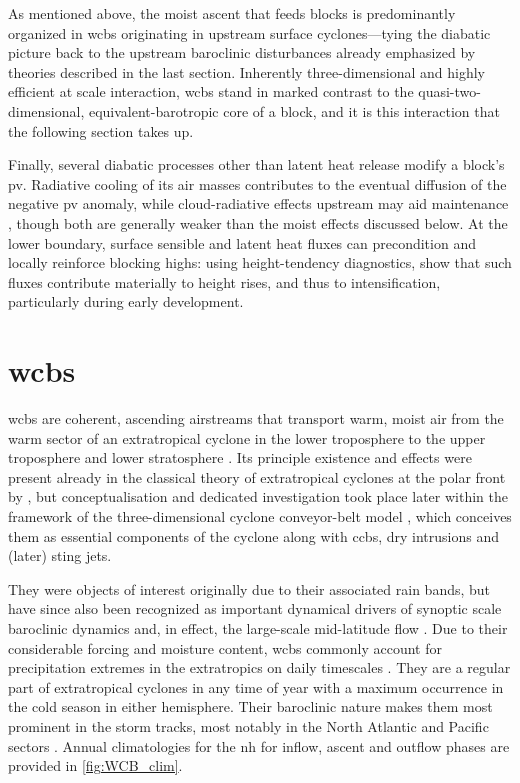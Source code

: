 As mentioned above, the moist ascent that feeds blocks is predominantly
organized in \glspl{wcb} originating in upstream surface
cyclones---tying the diabatic
picture back to the upstream baroclinic disturbances already emphasized
by theories described in the last section.
Inherently three-dimensional and highly efficient at scale interaction,
\glspl{wcb} stand in marked contrast to the quasi-two-dimensional,
equivalent-barotropic core of a block, and it is this interaction that the
following section takes up.

Finally, several diabatic processes other than latent heat release modify a block's
\gls{pv}. Radiative cooling of its air masses contributes to the eventual
diffusion of the negative \gls{pv} anomaly, while cloud-radiative effects
upstream may aid maintenance \parencite{lubisCloudRadiativeEffects2025},
though both are generally weaker than the moist effects discussed below. At
the lower boundary, surface sensible and latent heat fluxes can precondition
and locally reinforce blocking highs: using height-tendency diagnostics,
\textcite{tillyCalculatedHeightTendencies2008} show that such fluxes
contribute materially to height rises, and thus to intensification,
particularly during early development.

\section{\Glspl{wcb}}\label{sec:intro_wcb}

\Glspl{wcb} are coherent, ascending airstreams that transport warm, moist air
from the warm sector of an extratropical cyclone in the lower troposphere
to the upper troposphere and lower stratosphere
\parencite{schwenkRoleAscentTimescales2024}. Its principle existence and
effects were present already in the classical theory of extratropical cyclones
at the polar front by \textcite{BjerknesSolberg1922}, but conceptualisation and
dedicated investigation took place later within the framework of the
three-dimensional cyclone conveyor-belt model
\parencite[e.g.,~][]{browningStructureRainbandsMidlatitude1973},
which conceives them as essential components of the cyclone along with
\glspl{ccb}, dry intrusions and (later) sting jets.

They were objects of interest originally due to their associated rain bands,
but have since also been recognized as important dynamical drivers of synoptic
scale baroclinic dynamics
\parencite{madonnaWarmConveyorBelts2014a, binderRoleWarmConveyor2016} and, in
effect, the large-scale mid-latitude flow
\parencite{vishnupriyaInteractionWarmConveyor2025,
    blanchardMidlevelConvectionWarm2021}. Due to their considerable forcing and
moisture content, \glspl{wcb} commonly account for precipitation extremes in
the extratropics on daily timescales \parencite{pfahlWarmConveyorBelts2014}.
They are a regular part of extratropical cyclones in any time of year with a
maximum occurrence in the cold season in either hemisphere. Their baroclinic
nature makes them most prominent in the storm tracks, most notably in the
North Atlantic and Pacific sectors \parencite{madonnaWarmConveyorBelts2014a}.
Annual climatologies for the \gls{nh} for inflow, ascent and outflow phases
are provided in \cref{fig:WCB_clim}.

